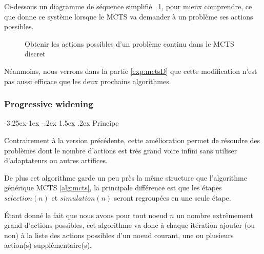 \documentclass[pdftex,french, english]{article}	%
\makeatletter
\newcounter {subsubsubsection}[subsubsection]
\newcommand\subsubsubsection{\@startsection{subsubsubsection}{4}{\z@}%
                                     {-3.25ex\@plus -1ex \@minus -.2ex}%
                                     {1.5ex \@plus .2ex}%
                                     {\normalfont\normalsize\bfseries}}
\makeatother
\begin{document}
		Ci-dessous un diagramme de séquence simplifié ~\ref{fig:actionsPossibles}, pour mieux comprendre, ce que donne ce système lorsque le MCTS va demander à un problème ses actions possibles.
		\begin{figure}[H]
			\centering
			\caption{Obtenir les actions possibles d'un problème continu dans le MCTS discret} \label{fig:actionsPossibles}
		\end{figure}

		Néanmoins, nous verrons dans la partie \ref{exp:mctsD} que cette modification n'est pas aussi efficace que les deux prochains algorithmes.
	\subsubsection{Progressive widening} \label{pw}

		\subsubsubsection{Principe} \label{pw:principe}

		Contrairement à la version précédente, cette amélioration permet de résoudre des problèmes dont le nombre d'actions est très grand voire infini sans utiliser d'adaptateurs ou autres artifices.

		De plus cet algorithme garde un peu près la même structure que l'algorithme générique MCTS \ref{alg:mcts}, la principale différence est que les étapes $selection(n)$ et $simulation(n)$ seront regroupées en une seule étape.

		Étant donné le fait que nous avons pour tout noeud $n$ un nombre extrêmement grand d'actions possibles, cet algorithme va donc à chaque itération ajouter (ou non) à la liste des actions possibles d'un noeud courant, une ou plusieurs action(s) supplémentaire(s).
\end{document}
